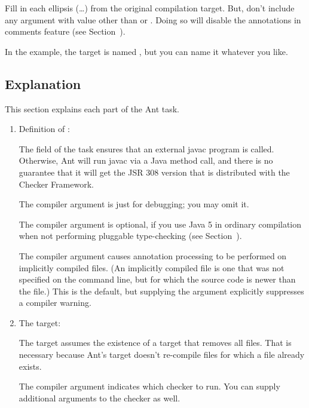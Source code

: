 \begin{enumerate}
Fill in each ellipsis (\ldots) from the original compilation target.  But,
don't include any  argument with value other than 
or .  Doing so will disable the annotations in
comments feature (see Section~).

In the example, the target is named , but you can
name it whatever you like.
\end{enumerate}

\subsection{Explanation\label{ant-task-explanation}}

This section explains each part of the Ant task.

\begin{enumerate}
\item Definition of :

The  field of the  task
ensures that an external javac program is called.  Otherwise, Ant will run
javac via a Java method call, and there is no guarantee that it will get
the JSR 308 version that is distributed with the Checker Framework.

The  compiler argument is just for debugging; you may omit
it.

The  compiler argument is optional, if you use Java 5 in
ordinary compilation when not performing pluggable type-checking (see
Section~).

The  compiler argument causes annotation processing
to be performed on implicitly compiled files.  (An implicitly compiled file
is one that was not specified on the command line, but for which the source
code is newer than the  file.)  This is the default, but
supplying the argument explicitly suppresses a compiler warning.


\item The  target:

The target assumes the existence of a  target that removes all
 files.  That is necessary because Ant's  target
doesn't re-compile  files for which a  file
already exists.

The  compiler argument indicates which checker to
run.  You can supply additional arguments to the checker as well.

\end{enumerate}


